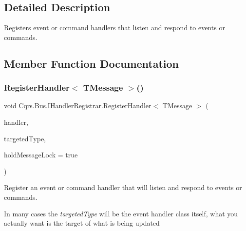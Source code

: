 \subsection{Detailed Description}
Registers event or command handlers that listen and respond to events or commands. 



\subsection{Member Function Documentation}
\mbox{\label{interfaceCqrs_1_1Bus_1_1IHandlerRegistrar_ab6ca4dfdc54a5aeebe4651dbdb479f55_ab6ca4dfdc54a5aeebe4651dbdb479f55}} 
\subsubsection{\texorpdfstring{Register\+Handler$<$ T\+Message $>$()}{RegisterHandler< TMessage >()}\hspace{0.1cm}{\footnotesize\ttfamily [1/2]}}
{\footnotesize\ttfamily void Cqrs.\+Bus.\+I\+Handler\+Registrar.\+Register\+Handler$<$ T\+Message $>$ (\begin{DoxyParamCaption}\item[{Action$<$ T\+Message $>$}]{handler,  }\item[{Type}]{targeted\+Type,  }\item[{bool}]{hold\+Message\+Lock = {\ttfamily true} }\end{DoxyParamCaption})}



Register an event or command handler that will listen and respond to events or commands. 

In many cases the {\itshape targeted\+Type}  will be the event handler class itself, what you actually want is the target of what is being updated 

